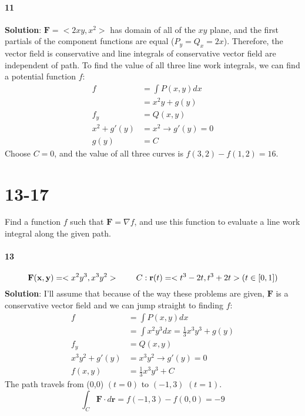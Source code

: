 \documentclass{article}
\begin{document}
    \paragraph{11} \textbf{Solution}: $\mathbf{F}=<2xy, x^2>$ has domain of all of the $xy$ plane, and the first partials of the
    component functions are equal ($P_y = Q_x = 2x$).
    Therefore, the vector field is conservative and line integrals of conservative vector field are independent of path. To find the value of all three
    line work integrals, we can find a potential function $f$:
    \begin{align*}
        f &= \int P(x,y)dx \\
        &= x^{2}y + g(y)\\
        f_y &= Q(x,y) \\
        x^2 + g'(y) &= x^2 \rightarrow g'(y) = 0 \\
        g(y) &= C
    \end{align*}
    Choose $C=0$, and the value of all three curves is $f(3,2)-f(1,2)=16$.

    \section*{13-17} Find a function $f$ such that $\mathbf{F} = \nabla f$, and use this function to evaluate a line
    work integral along the given path.

    \paragraph{13}
    \[\mathbf{F(x,y)}=<x^{2}y^{3}, x^{3}y^{2}> \hspace{0.3in} C: \mathbf{r}(t) = <t^3-2t, t^3+2t> (t\in [0,1])\]
    \textbf{Solution}: I'll assume that because of the way these problems are given, $\mathbf{F}$ is a conservative vector field and
    we can jump straight to finding $f$:
    \begin{align*}
        f &= \int P(x,y) dx \\
        &= \int x^{2}y^{3}dx = \frac{1}{3}x^{3}y^{3} + g(y) \\
        f_y &= Q(x,y)\\
        x^{3}y^{2} + g'(y) &= x^{3}y^{2} \rightarrow g'(y) = 0\\
        f(x,y) &= \frac{1}{3}x^{3}y^{3} + C
    \end{align*}
    The path travels from (0,0) $(t=0)$ to $(-1,3)$ $(t=1)$.
    \[\int_C \mathbf{F\cdot}d\mathbf{r} = f(-1,3)-f(0,0) = -9\]
\end{document}
